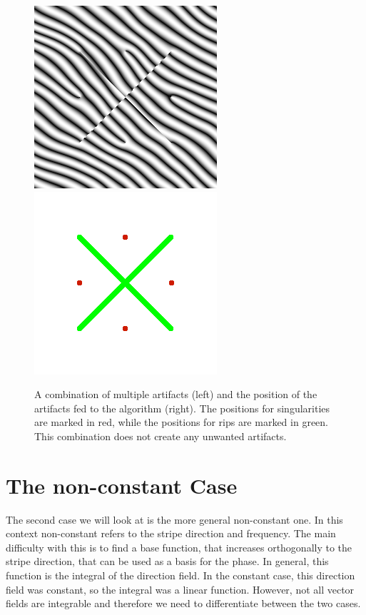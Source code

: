 \documentclass{utue} %
\begin{document}
\begin{figure}[ht]
  \centering
  \includegraphics[width=0.49\linewidth]{images/combiningArtifacts}
  \includegraphics[width=0.49\linewidth]{images/combiningArtifactsPositions}
  \caption{A combination of multiple artifacts (left) and the position of the artifacts fed to the algorithm (right). The positions for singularities are marked in red, while the positions for rips are marked in green. This combination does not create any unwanted artifacts.}\label{fig:combiningArtifacts}
\end{figure}



\section{The non-constant Case}\label{sec:nonConstant}
The second case we will look at is the more general non-constant one. In this context non-constant refers to the stripe direction and frequency. The main difficulty with this is to find a base function, that increases orthogonally to the stripe direction, that can be used as a basis for the phase. In general, this function is the integral of the direction field. In the constant case, this direction field was constant, so the integral was a linear function. However, not all vector fields are integrable and therefore we need to differentiate between the two cases.
\end{document}

